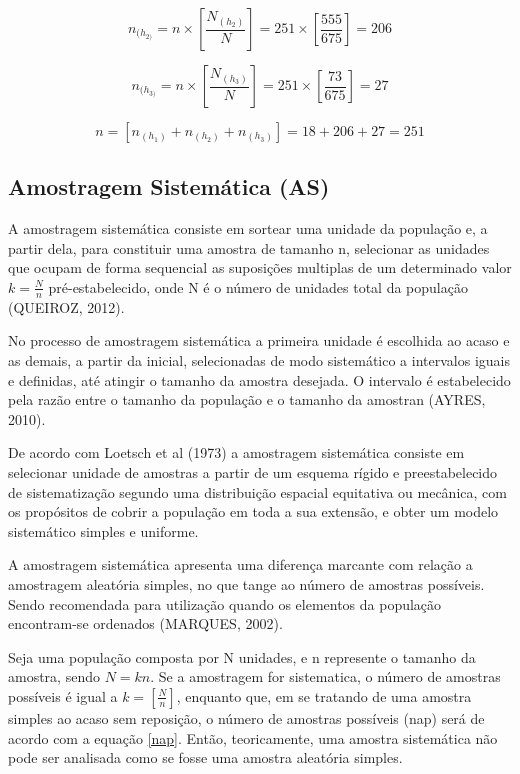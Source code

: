 $$ 	n_{(h_{2)}}= n \times \left[\frac{N_{(h_{2})}}{N} \right]=251 \times \left[\frac{555}{675}\right]= 206 $$

$$ 	n_{(h_{3)}}= n \times \left[\frac{N_{(h_{3})}}{N} \right]= 251 \times \left[\frac{73}{675}\right]= 27 $$

$$ n = \left[ n_{(h_{1})} + n_{(h_{2})} + n_{(h_{3})}\right]= 18+206+27 = 251
$$

\subsection{Amostragem Sistemática (AS)}

A amostragem sistemática consiste em sortear uma unidade da população e, a partir dela, para constituir
uma amostra de tamanho n, selecionar as unidades que ocupam de forma sequencial as suposições multiplas
de um determinado valor $k=\frac{N}{n}$ pré-estabelecido, onde N é o número de unidades total da população (QUEIROZ, 2012).\vskip0.3cm

No processo de amostragem sistemática a primeira unidade é escolhida ao acaso e as demais, a partir da inicial, selecionadas de modo sistemático a intervalos iguais e definidas, até atingir o tamanho da amostra desejada. O intervalo é estabelecido pela razão entre o tamanho da população e o tamanho da amostran (AYRES, 2010).\vskip0.3cm

De acordo com Loetsch et al (1973) a amostragem sistemática consiste em selecionar unidade de amostras a partir
de um esquema rígido e preestabelecido de sistematização segundo uma distribuição espacial equitativa ou mecânica, com os propósitos de cobrir a população em toda a sua extensão, e obter um modelo sistemático simples e uniforme.\vskip0.3cm

A amostragem sistemática apresenta uma diferença marcante com relação a amostragem aleatória simples, no que tange
ao número de amostras possíveis. Sendo recomendada para utilização quando os elementos da população encontram-se
ordenados (MARQUES, 2002).\vskip0.3cm

\newpage
Seja uma população composta por N unidades, e n represente o tamanho da amostra, sendo $N=kn$. Se a amostragem for sistematica, o número de amostras possíveis é igual a $k =\left[ \frac{N}{n} \right] $, enquanto que, em se tratando de uma amostra simples ao acaso sem reposição, o número de amostras possíveis (nap) será de acordo com a equação \ref{nap}. Então, teoricamente, uma amostra sistemática não pode ser analisada como se fosse uma amostra aleatória simples. \vskip0.3cm

